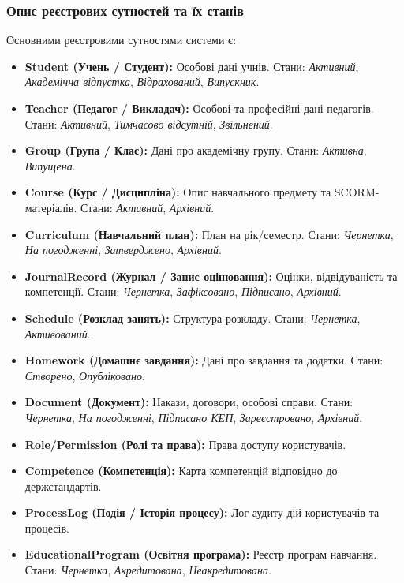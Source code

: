 \documentclass{article}
\begin{document}
\subsubsection{Опис реєстрових сутностей та їх станів}
Основними реєстровими сутностями системи є:
\begin{itemize}
    \item \textbf{Student (Учень / Студент):} Особові дані учнів. Стани: \textit{Активний}, \textit{Академічна відпустка}, \textit{Відрахований}, \textit{Випускник}.
    \item \textbf{Teacher (Педагог / Викладач):} Особові та професійні дані педагогів. Стани: \textit{Активний}, \textit{Тимчасово відсутній}, \textit{Звільнений}.
    \item \textbf{Group (Група / Клас):} Дані про академічну групу. Стани: \textit{Активна}, \textit{Випущена}.
    \item \textbf{Course (Курс / Дисципліна):} Опис навчального предмету та SCORM-матеріалів. Стани: \textit{Активний}, \textit{Архівний}.
    \item \textbf{Curriculum (Навчальний план):} План на рік/семестр. Стани: \textit{Чернетка}, \textit{На погодженні}, \textit{Затверджено}, \textit{Архівний}.
    \item \textbf{JournalRecord (Журнал / Запис оцінювання):} Оцінки, відвідуваність та компетенції. Стани: \textit{Чернетка}, \textit{Зафіксовано}, \textit{Підписано}, \textit{Архівний}.
    \item \textbf{Schedule (Розклад занять):} Структура розкладу. Стани: \textit{Чернетка}, \textit{Активований}.
    \item \textbf{Homework (Домашнє завдання):} Дані про завдання та додатки. Стани: \textit{Створено}, \textit{Опубліковано}.
    \item \textbf{Document (Документ):} Накази, договори, особові справи. Стани: \textit{Чернетка}, \textit{На погодженні}, \textit{Підписано КЕП}, \textit{Зареєстровано}, \textit{Архівний}.
    \item \textbf{Role/Permission (Ролі та права):} Права доступу користувачів.
    \item \textbf{Competence (Компетенція):} Карта компетенцій відповідно до держстандартів.
    \item \textbf{ProcessLog (Подія / Історія процесу):} Лог аудиту дій користувачів та процесів.
    \item \textbf{EducationalProgram (Освітня програма):} Реєстр програм навчання. Стани: \textit{Чернетка}, \textit{Акредитована}, \textit{Неакредитована}.
\end{itemize}
\end{document}
